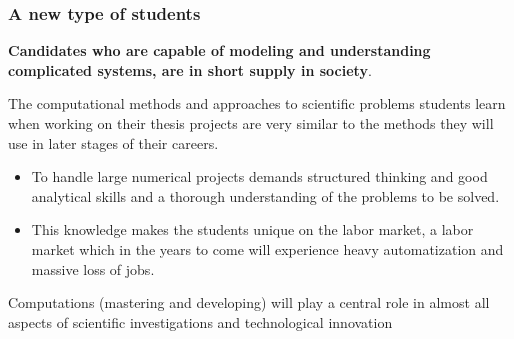 \documentclass{beamer}
\begin{document}
\begin{frame}
\frametitle{A new type of students}

\begin{block}{}
\textbf{Candidates who are capable of modeling and understanding complicated
systems, are in short supply in society}.  
\end{block}
\begin{block}{}
The computational methods and approaches to scientific problems students learn
when working on their thesis projects are very similar to the methods
they will use in later stages of their careers.  
\begin{itemize}
\item To handle large numerical projects demands structured thinking and good analytical skills and a thorough understanding of the problems to be solved. 

\item This knowledge makes the students unique on the labor market, a labor market which in the years to come will experience heavy automatization and massive loss of jobs.
\end{itemize}

\noindent
\end{block}

\begin{block}{}
Computations (mastering and developing)  will play a central role in almost all aspects of scientific investigations and technological innovation
\end{block}
\end{frame}
\end{document}
